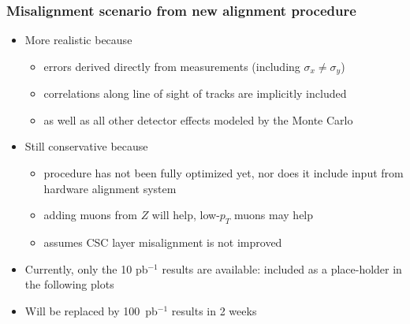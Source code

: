 \documentclass[compress]{beamer}
\begin{document}
\begin{frame}
\frametitle{Misalignment scenario from new alignment procedure}
\begin{itemize}\setlength{\itemsep}{0.25 cm}
\item More realistic because
\begin{itemize}\setlength{\itemsep}{0.1 cm}
\item errors derived directly from measurements (including $\sigma_x \ne \sigma_y$)
\item correlations along line of sight of tracks are implicitly included
\item as well as all other detector effects modeled by the Monte Carlo
\end{itemize}

\item Still conservative because
\begin{itemize}\setlength{\itemsep}{0.1 cm}
\item procedure has not been fully optimized yet, nor does it include input from hardware alignment system
\item adding muons from $Z$ will help, low-$p_T$ muons may help
\item assumes CSC layer misalignment is not improved
\end{itemize}

\item Currently, only the 10 pb$^{-1}$ results are available: included as a
place-holder in the following plots
\item Will be replaced by 100~pb$^{-1}$ results in 2 weeks
\end{itemize}
\end{frame}
\end{document}
